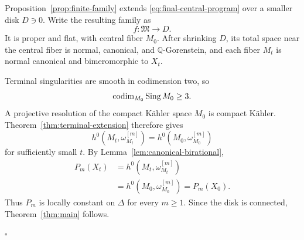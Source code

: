 \documentclass[11pt,a4paper]{article}
\theoremstyle{definition}\newtheorem{definition}[theorem]{Definition}
\theoremstyle{remark}\newtheorem*{remark}{Remark}
\newcommand{\Q}{\mathbb Q}\newcommand{\C}{\mathbb C}
\begin{document}
Proposition~\ref{prop:finite-family} extends
\eqref{eq:final-central-program} over a smaller disk $D\ni0$.
Write the resulting family as
\[
 f:\mathfrak M\longrightarrow D.
\]
It is proper and flat, with central fiber $M_0$.
After shrinking $D$, its total space near the central fiber is normal,
canonical, and $\Q$-Gorenstein, and each fiber $M_t$ is normal canonical
and bimeromorphic to $X_t$.

Terminal singularities are smooth in codimension two, so
\[
 \operatorname{codim}_{M_0}\operatorname{Sing} M_0\ge3.
\]
A projective resolution of the compact Kähler space $M_0$ is compact
Kähler. Theorem~\ref{thm:terminal-extension} therefore gives
\[
 h^0(M_t,\omega_{M_t}^{[m]})
 =h^0(M_0,\omega_{M_0}^{[m]})
\]
for sufficiently small $t$.
By Lemma~\ref{lem:canonical-birational},
\begin{align*}
 P_m(X_t)
 &=h^0(M_t,\omega_{M_t}^{[m]})\\
 &=h^0(M_0,\omega_{M_0}^{[m]})
 =P_m(X_0).
\end{align*}
Thus $P_m$ is locally constant on $\Delta$ for every $m\ge1$.
Since the disk is connected, Theorem~\ref{thm:main} follows.

\hfill$\square$
\end{document}
